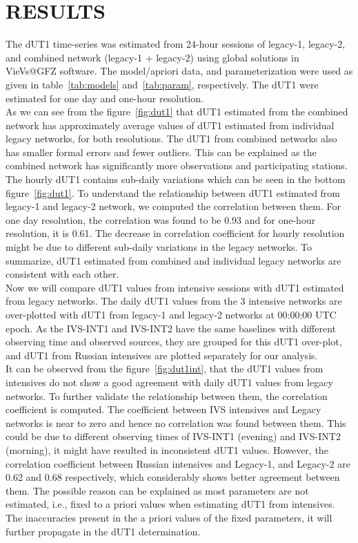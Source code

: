 \documentclass[smallextended]{svjour3}       %
\begin{document}
\section{RESULTS}
The dUT1 time-series was estimated from 24-hour sessions of legacy-1, legacy-2, and combined network (legacy-1 + legacy-2) using global solutions in VieVs@GFZ software. The model/apriori data, and parameterization were used as given in table~\ref{tab:models} and~\ref{tab:param}, respectively. The dUT1 were estimated for one day and one-hour resolution. \\
As we can see from the figure~\ref{fig:dut1} that dUT1 estimated from the combined network has approximately average values of dUT1 estimated from individual legacy networks, for both resolutions. The dUT1 from combined networks also has smaller formal errors and fewer outliers. This can be explained as the combined network has significantly more observations and participating stations. The hourly dUT1 contains sub-daily variations which can be seen in the bottom figure~\ref{fig:dut1}. To understand the relationship between dUT1 estimated from legacy-1 and legacy-2 network, we computed the correlation between them. For one day resolution, the correlation was found to be 0.93 and for one-hour resolution, it is 0.61. The decrease in correlation coefficient for hourly resolution might be due to different sub-daily variations in the legacy networks. 
To summarize, dUT1 estimated from combined and individual legacy networks are consistent with each other. \\
Now we will compare dUT1 values from intensive sessions with dUT1 estimated from legacy networks. 
The daily dUT1 values from the 3 intensive networks are over-plotted with dUT1 from legacy-1 and legacy-2 networks at 00:00:00 UTC epoch. As the IVS-INT1 and IVS-INT2 have the same baselines with different observing time and observed sources, they are grouped for this dUT1 over-plot, and dUT1 from Russian intensives are plotted separately for our analysis. \\
It can be observed from the figure~\ref{fig:dut1int}, that the dUT1 values from intensives do not show a good agreement with daily dUT1 values from legacy networks. To further validate the relationship between them, the correlation coefficient is computed. The coefficient between IVS intensives and Legacy networks is near to zero and hence no correlation was found between them. This could be due to different observing times of IVS-INT1 (evening) and IVS-INT2 (morning), it might have resulted in inconsistent dUT1 values. However, the correlation coefficient between Russian intensives and Legacy-1, and Legacy-2 are 0.62 and 0.68 respectively, which considerably shows better agreement between them. The possible reason can be explained as most parameters are not estimated, i.e., fixed to a priori values when estimating dUT1 from intensives. The inaccuracies present in the a priori values of the fixed parameters, it will further propagate in the dUT1 determination. \\
\end{document}
